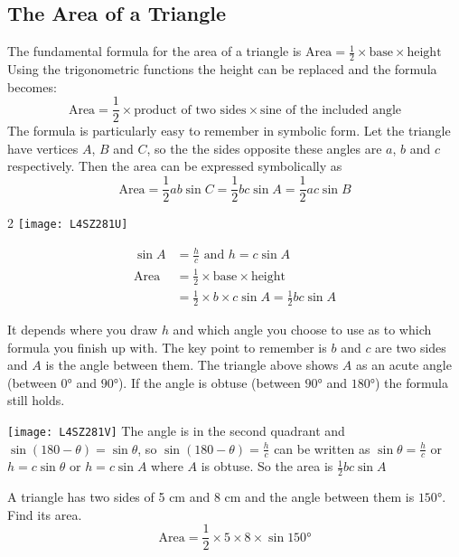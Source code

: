  

\subsection*{The Area of a Triangle}
The fundamental formula for the area of a triangle is $\text{Area} =\frac{1}{2} \times \text{base} \times \text{height}$ Using the trigonometric functions the height can be replaced and the formula becomes:
\begin{equation*}\text{Area} =\frac{1}{2} \times \text{product of two sides} \times \text{sine of the included angle}
\end{equation*}
The formula is particularly easy to remember in symbolic form. Let the triangle have vertices $A$, $B$ and $C$, so the the sides opposite these angles are $a$, $b$ and $c$ respectively. Then the area can be expressed symbolically as
\begin{equation*}\text{Area} =\frac{1}{2} a b \sin  C =\frac{1}{2} b c \sin  A =\frac{1}{2} a c \sin  B
\end{equation*}

\columnsep =30pt
\begin {multicols}{2} 
\texttt{[image: L4SZ281U]}\label{fig:triangleArea}

\begin{align*}\sin  A &  = \frac{h}{c}\text{ and }h =c \sin  A \\
\text{Area} &  =  \frac{1}{2} \times \text{base} \times \text{height} \\
 &  =  \frac{1}{2} \times b \times c \sin  A =\frac{1}{2} b c \sin  A
 \end{align*}
\end {multicols}
It depends where you draw $h$ and which angle you choose to use as to which formula you finish up with. The key point to remember is $b$ and $c$ are two sides and $A$ is the angle between them. The triangle above shows $A$ as an acute angle (between $\ang{0}$ and $\ang{90} $). If the angle is obtuse (between $\ang{90} $ and $\ang{180} $) the formula still holds. 
\begin{multicols}{2}
\texttt{[image: L4SZ281V]}
The angle is in the second quadrant and $\sin  (180 -\theta ) =\sin  \theta $, so $\sin  (180 -\theta ) =\frac{h}{c}$ can be written as $\sin  \theta  =\frac{h}{c}$ or $h =c \sin  \theta $ or $h =c \sin  A$ where $A$ is obtuse. So the area is $\frac{1}{2} b c \sin  A$ 
\end{multicols}

\example A triangle has two sides of 5 cm and 8 cm and the angle between them is $\ang{150} $. Find its area.\medskip\\
\solution
\begin{equation*}\text{Area} =\frac{1}{2} \times 5 \times 8 \times \sin  \ang{150} 
\end{equation*}

